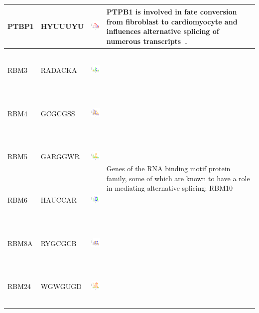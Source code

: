 \documentclass[a4paper,10pt]{article}
\begin{document}
\begin{center}
\begin{longtable}{|l|l|l|p{6cm}|}
\hline
PTBP1 & HYUUUYU  & \includegraphics[height=0.8in]{./seqLogo/PTBP1_hyuuuyu.pdf} & PTPB1 is involved in fate conversion from fibroblast to cardiomyocyte and influences alternative splicing of numerous transcripts~\cite{Liu2017}.\\
\hline
RBM3 & RADACKA & \includegraphics[height=0.8in]{./seqLogo/RBM3_radacka.pdf} &
 \multirow{12}{6cm}{
Genes of the RNA binding motif protein family, some of which are known to have a role in 
mediating alternative splicing: RBM10~\cite{Inoue2014} }\\
RBM4 & GCGCGSS & \includegraphics[height=0.8in]{./seqLogo/RBM4_gcgcgss.pdf} & \\
RBM5 & GARGGWR & \includegraphics[height=0.8in]{./seqLogo/RBM5_garggwr.pdf} & \\
RBM6 & HAUCCAR & \includegraphics[height=0.8in]{./seqLogo/RBM6_hauccar.pdf} & \\
RBM8A  & RYGCGCB & \includegraphics[height=0.8in]{./seqLogo/RBM8A_rygcgcb.pdf} & \\
RBM24 & WGWGUGD & \includegraphics[height=0.8in]{./seqLogo/RBM24_wgwgugd.pdf}& \\

\end{longtable}
\end{center}
\end{document}
